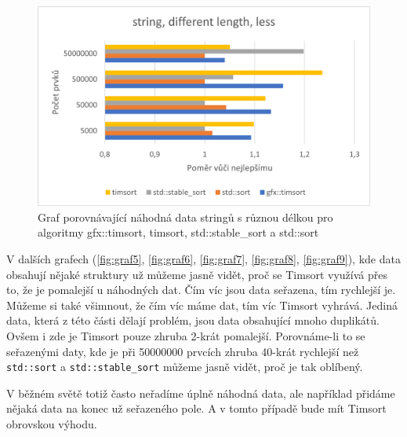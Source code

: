 \documentclass[thesis=B,czech]{FITthesis}[2019/12/23]
\begin{document}
\begin{figure}[htbp]\centering
	\includegraphics{obrazky/graf4.png}
	\caption[Graf porovnávající náhodná data stringů s různou délkou pro algoritmy gfx::timsort, timsort, std::stable\_sort a std::sort]{Graf porovnávající náhodná data stringů s různou délkou pro algoritmy gfx::timsort, timsort, std::stable\_sort a std::sort}\label{fig:graf4}
\end{figure}

\FloatBarrier

V dalších grafech (\ref{fig:graf5}, \ref{fig:graf6}, \ref{fig:graf7}, \ref{fig:graf8}, \ref{fig:graf9}), kde data obsahují nějaké struktury už můžeme jasně vidět, proč se Timsort využívá přes to, že je pomalejší u náhodných dat. Čím víc jsou data seřazena, tím rychlejší je. Můžeme si také všimnout, že čím víc máme dat, tím víc Timsort vyhrává. Jediná data, která z této části dělají problém, jsou data obsahující mnoho duplikátů. Ovšem i zde je Timsort pouze zhruba 2-krát pomalejší. Porovnáme-li to se seřazenými daty, kde je při 50000000 prvcích zhruba 40-krát rychlejší než \texttt{std::sort} a \texttt{std::stable\_sort} můžeme jasně vidět, proč je tak oblíbený. 

V běžném světě totiž často neřadíme úplně náhodná data, ale například přidáme nějaká data na konec už seřazeného pole. A v tomto případě bude mít Timsort obrovskou výhodu.
\end{document}

